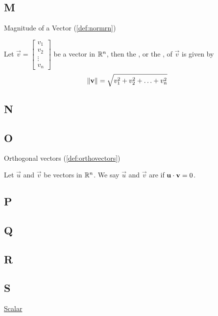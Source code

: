 \documentclass{ximera}
\begin{document}
\subsection{M}
Magnitude of a Vector (\ref{def:normrn})
\begin{expandable}
Let $\vec{v}=\begin{bmatrix}v_1\\ v_2\\ \vdots \\v_n\end{bmatrix}$ be a vector in $\mathbb{R}^n$, then the , or the , of $\vec{v}$ is given by
\begin{equation*}  
\left\lVert\mathbf{v}\right\rVert=\sqrt{v_1^2+v_2^2+\ldots +v_n^2}
\end{equation*}
\end{expandable}
    


\subsection{N}

\subsection{O}
Orthogonal vectors (\ref{def:orthovectors}) 
\begin{expandable}
Let $\vec{u}$ and $\vec{v}$ be vectors in $\mathbb{R}^n$. We say $\vec{u}$ and $\vec{v}$ are  if $\mathbf{u}\cdot \mathbf{v}=0$.
\end{expandable}

\subsection{P}

\subsection{Q}

\subsection{R}

\subsection{S}
\href{https://ximera.osu.edu/oerlinalg/LinearAlgebra/VEC-0010/main}{Scalar} 
\end{document}
